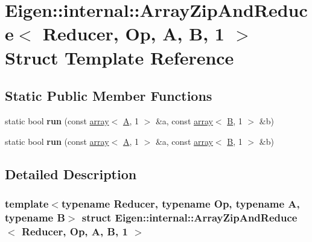 \hypertarget{struct_eigen_1_1internal_1_1_array_zip_and_reduce_3_01_reducer_00_01_op_00_01_a_00_01_b_00_011_01_4}{}\section{Eigen\+:\+:internal\+:\+:Array\+Zip\+And\+Reduce$<$ Reducer, Op, A, B, 1 $>$ Struct Template Reference}
\label{struct_eigen_1_1internal_1_1_array_zip_and_reduce_3_01_reducer_00_01_op_00_01_a_00_01_b_00_011_01_4}
\subsection*{Static Public Member Functions}
\begin{DoxyCompactItemize}
\item 
\mbox{\label{struct_eigen_1_1internal_1_1_array_zip_and_reduce_3_01_reducer_00_01_op_00_01_a_00_01_b_00_011_01_4_a3e0ea5e8320030c923e58053826cf452}} 
static bool {\bfseries run} (const \hyperlink{class_eigen_1_1array}{array}$<$ \hyperlink{group___core___module_class_eigen_1_1_matrix}{A}, 1 $>$ \&a, const \hyperlink{class_eigen_1_1array}{array}$<$ \hyperlink{group___core___module_class_eigen_1_1_matrix}{B}, 1 $>$ \&b)
\item 
\mbox{\label{struct_eigen_1_1internal_1_1_array_zip_and_reduce_3_01_reducer_00_01_op_00_01_a_00_01_b_00_011_01_4_a3e0ea5e8320030c923e58053826cf452}} 
static bool {\bfseries run} (const \hyperlink{class_eigen_1_1array}{array}$<$ \hyperlink{group___core___module_class_eigen_1_1_matrix}{A}, 1 $>$ \&a, const \hyperlink{class_eigen_1_1array}{array}$<$ \hyperlink{group___core___module_class_eigen_1_1_matrix}{B}, 1 $>$ \&b)
\end{DoxyCompactItemize}


\subsection{Detailed Description}
\subsubsection*{template$<$typename Reducer, typename Op, typename A, typename B$>$\newline
struct Eigen\+::internal\+::\+Array\+Zip\+And\+Reduce$<$ Reducer, Op, A, B, 1 $>$}



